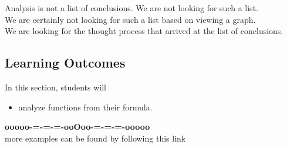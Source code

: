 \documentclass{ximera}
\begin{document}
Analysis is not a list of conclusions. We are not looking for such a list. \\

We are certainly not looking for such a list based on viewing a graph. \\

We are looking for the thought process that arrived at the list of conclusions. \\









\subsection{Learning Outcomes}



\begin{sectionOutcomes}
In this section, students will 

\begin{itemize}
\item analyze functions from their formula.
\end{itemize}
\end{sectionOutcomes}








\begin{center}
\textbf{\textcolor{green!50!black}{ooooo-=-=-=-ooOoo-=-=-=-ooooo}} \\

more examples can be found by following this link\\ 

\end{center}
\end{document}

